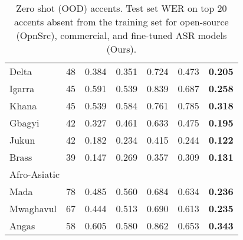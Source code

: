 \documentclass[11pt,a4paper]{article}
\begin{document}
\begin{table}
\begin{tabular}{l|l|l|l|l|l|l}
Delta         &    48 &                                                                               0.384 &  0.351 &  0.724 &  0.473 &                                                                                       \textbf{0.205} \\
Igarra        &    45 &                                                                                        0.591 &  0.539 &  0.839 &  0.687 &                                                                                         \textbf{0.258} \\
Khana         &     45 &                                                                                        0.539 &  0.584 &  0.761 &  0.785 &                                                                                         \textbf{0.318} \\
Gbagyi        &    42 &                                                                                     0.327 &  0.461 &  0.633 &  0.475 &                                                                                        \textbf{0.195} \\
Jukun         &    42 &                                                                                    0.182 &  0.234 &  0.415 &  0.244 &                                                                                        \textbf{0.122} \\
Brass         &    39 &                                                                                        0.147 &  0.269 &  0.357 &  0.309 &                                                                                        \textbf{0.131} \\                           
\hline
\multicolumn{7}{l}{Afro-Asiatic}\\
\hline
Mada          &    78 &                                                                                     0.485 &  0.560 &  0.684 &  0.634 &                                                                                         \textbf{0.236} \\
Mwaghavul     &     67 &                                                                                      0.444 &  0.513 &  0.690 &  0.613 &                                                                                         \textbf{0.235} \\
Angas         &    58 &                                                                                       0.605 &  0.580 &  0.862 &  0.653 &                                                                                         \textbf{0.343} \\
\bottomrule
\end{tabular}
\caption{Zero shot (OOD) accents. Test set WER on top 20 accents absent from the training set for open-source (OpnSrc), commercial, and fine-tuned ASR models (Ours).}
\label{tab:OOD_accents_WER}
\end{table}
\end{document}
